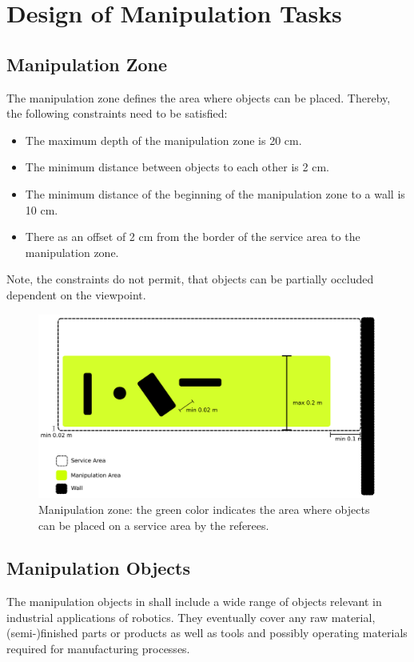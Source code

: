 \section{Design of Manipulation Tasks} \label{sec:ManipulationTasks}


\subsection{Manipulation Zone} \label{ssec:ManipulationZone}
The manipulation zone defines the area where objects can be placed. Thereby, the following constraints need to be satisfied:
\begin{itemize}
	\item The maximum depth of the manipulation zone is 20 cm.
	\item The minimum distance between objects to each other is 2 cm.
	\item The minimum distance of the beginning of the manipulation zone to a wall is 10 cm.
	\item There as an offset of 2 cm from the border of the service area to the manipulation zone.
\end{itemize}
Note, the constraints do not permit, that objects can be partially occluded dependent on the viewpoint.
\begin{figure} [h!]
\centering
\includegraphics[width=1.0\textwidth ]{./images/manipulation_zone.pdf}
\caption{Manipulation zone: the green color indicates the area where objects can be placed on a service area by the referees.}
\label{fig:manipulation_zone}
\end{figure}


\subsection{Manipulation Objects} \label{ssec:ManipulationObjects}
The manipulation objects in \RCAW shall include a wide range of objects relevant in industrial applications of robotics. They eventually cover any raw material, (semi-)finished parts or products as well as tools and possibly operating materials required for manufacturing processes.
\par

